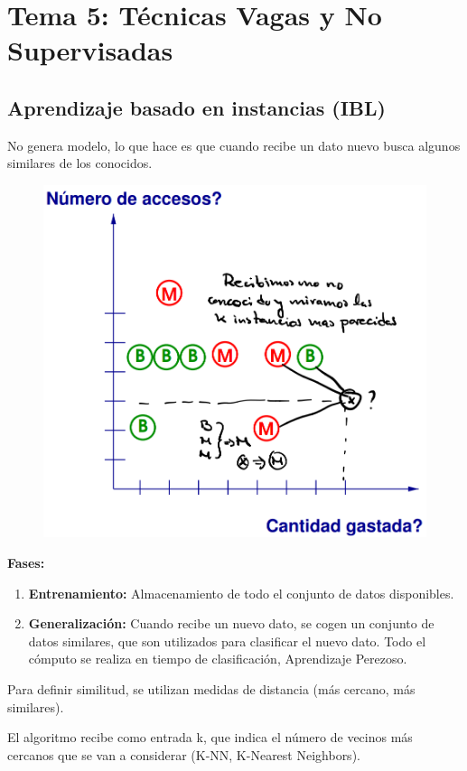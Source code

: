 \documentclass[12pt, twoside, openright]{report} %
\begin{document}
\chapter{Tema 5: Técnicas Vagas y No Supervisadas}
\section{Aprendizaje basado en instancias (IBL)}
No genera modelo, lo que hace es que cuando recibe un dato nuevo busca algunos similares de los conocidos.
\begin{figure}[H]
	{\includegraphics[scale=.3]{2021-03-19 12_05_34-Aprendizaje basado en instancias y no supervisados.pdf - Foxit Reader.png}}
\end{figure}
\textbf{Fases:}
\begin{enumerate}
  \item \textbf{Entrenamiento:} Almacenamiento de todo el conjunto de datos disponibles.
  \item \textbf{Generalización:} Cuando recibe un nuevo dato, se cogen un conjunto de datos similares, que son utilizados para clasificar el nuevo dato. Todo el cómputo se realiza en tiempo de clasificación, Aprendizaje Perezoso.
\end{enumerate}
Para definir similitud, se utilizan medidas de distancia (más cercano, más similares).

El algoritmo recibe como entrada k, que indica el número de vecinos más cercanos que se van a considerar (K-NN, K-Nearest Neighbors). 
\end{document}
